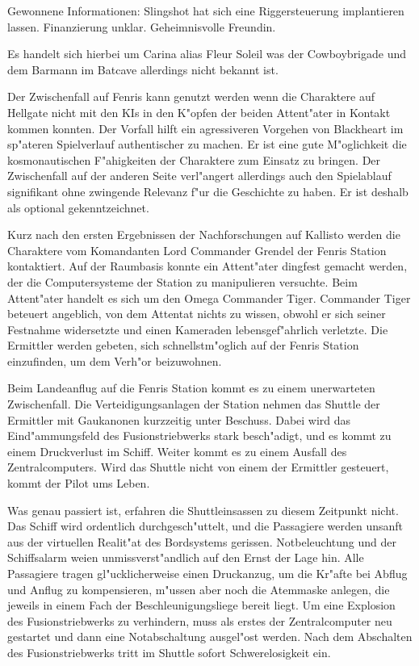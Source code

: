 \begin{remarks}
	Gewonnene Informationen: Slingshot hat sich eine Riggersteuerung implantieren lassen. Finanzierung unklar. Geheimnisvolle Freundin. 
	
	Es handelt sich hierbei um Carina alias Fleur Soleil was der Cowboybrigade und dem Barmann im Batcave allerdings nicht bekannt ist.
\end{remarks}


Der Zwischenfall auf Fenris kann genutzt werden wenn die Charaktere auf Hellgate nicht mit den KIs in den K"opfen der beiden Attent"ater in Kontakt kommen konnten. Der Vorfall hilft ein agressiveren Vorgehen von Blackheart im sp"ateren Spielverlauf authentischer zu machen. Er ist eine gute M"oglichkeit die kosmonautischen F"ahigkeiten der Charaktere zum Einsatz zu bringen. Der Zwischenfall auf der anderen Seite verl"angert allerdings auch den Spielablauf signifikant ohne zwingende Relevanz f"ur die Geschichte zu haben. Er ist deshalb als optional gekenntzeichnet.

Kurz nach den ersten Ergebnissen der Nachforschungen auf Kallisto werden die Charaktere vom Komandanten Lord Commander Grendel der Fenris Station kontaktiert. Auf der Raumbasis konnte ein Attent"ater dingfest gemacht werden, der die Computersysteme der Station zu manipulieren versuchte. Beim Attent"ater handelt es sich um den Omega Commander Tiger. Commander Tiger beteuert angeblich, von dem Attentat nichts zu wissen, obwohl er sich seiner Festnahme widersetzte und einen Kameraden lebensgef"ahrlich verletzte. Die Ermittler werden gebeten, sich schnellstm"oglich auf der Fenris Station einzufinden, um dem Verh"or beizuwohnen.

Beim Landeanflug auf die Fenris Station kommt es zu einem unerwarteten Zwischenfall. Die Verteidigungsanlagen der Station nehmen das Shuttle der Ermittler mit Gau\3kanonen kurzzeitig unter Beschuss. Dabei wird das Eind"ammungsfeld des Fusionstriebwerks stark besch"adigt, und es kommt zu einem Druckverlust im Schiff. Weiter kommt es zu einem Ausfall des Zentralcomputers. Wird das Shuttle nicht von einem der Ermittler gesteuert, kommt der Pilot ums Leben.

Was genau passiert ist, erfahren die Shuttleinsassen zu diesem Zeitpunkt nicht. Das Schiff wird ordentlich durchgesch"uttelt, und die Passagiere werden unsanft aus der virtuellen Realit"at des Bordsystems gerissen. Notbeleuchtung und der Schiffsalarm wei\3en unmissverst"andlich auf den Ernst der Lage hin. Alle Passagiere tragen gl"ucklicherweise einen Druckanzug, um die Kr"afte bei Abflug und Anflug zu kompensieren, m"ussen aber noch die Atemmaske anlegen, die jeweils in einem Fach der Beschleunigungsliege bereit liegt. Um eine Explosion des Fusionstriebwerks zu verhindern, muss als erstes der Zentralcomputer neu gestartet und dann eine Notabschaltung ausgel"ost werden. Nach dem Abschalten des Fusionstriebwerks tritt im Shuttle sofort Schwerelosigkeit ein.

